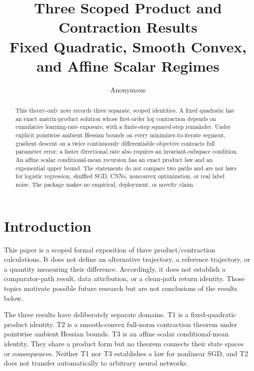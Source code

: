 \documentclass{article}
\title{Three Scoped Product and Contraction Results\\
Fixed Quadratic, Smooth Convex, and Affine Scalar Regimes}
\author{Anonymous}
\begin{document}
\maketitle

\begin{abstract}
This theory-only note records three separate, scoped identities. A fixed
quadratic has an exact matrix-product solution whose first-order log
contraction depends on cumulative learning-rate exposure, with a finite-step
squared-step remainder. Under explicit pointwise ambient Hessian bounds on
every minimizer-to-iterate segment, gradient descent on a twice continuously
differentiable objective contracts full parameter error; a faster directional
rate also requires an invariant-subspace condition. An affine scalar
conditional-mean recursion has an exact product law and an exponential upper
bound. The statements do not compare two paths and are not laws for logistic
regression, shuffled SGD, CNNs, nonconvex optimization, or real label noise.
The package makes no empirical, deployment, or novelty claim.
\end{abstract}

\section{Introduction}
\label{sec:intro}

This paper is a scoped formal exposition of three product/contraction
calculations. It does not define an alternative trajectory, a reference
trajectory, or a quantity measuring their difference. Accordingly, it does
not establish a comparator-path result, data attribution, or a clean-path
return identity. Those topics motivate possible future research but are not
conclusions of the results below.

The three results have deliberately separate domains. T1 is a fixed-quadratic
product identity. T2 is a smooth-convex full-norm contraction theorem under
pointwise ambient Hessian bounds. T3 is an affine scalar conditional-mean
identity. They share a product form but no theorem connects their state spaces
or consequences. Neither T1 nor T3 establishes a law for nonlinear SGD, and
T2 does not transfer automatically to arbitrary neural networks.
\end{document}
